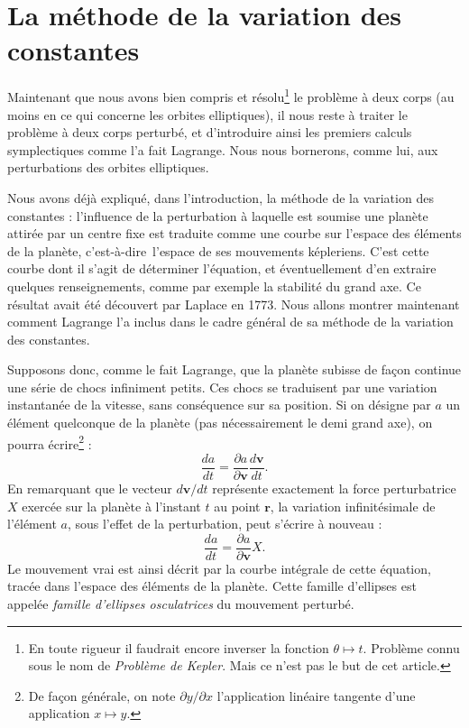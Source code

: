\documentclass[12pt,paperletter, reqno]{amsart}
\newcommand{\rr}{\mathbf{r}}
\newcommand{\vv}{\mathbf{v}}
\newcommand{\cad}{c'est-\`a-dire}
\theoremstyle{plain}
\theoremstyle{remark}
\begin{document}
  
  
  \section{La méthode de la variation des constantes}
  
  Maintenant que nous avons bien compris et résolu\footnote{En toute rigueur il faudrait encore inverser la fonction $\theta \mapsto t$. Problème connu sous le nom de \emph{Problème de Kepler}. Mais ce n'est pas le but de cet article.} le problème à deux corps (au moins en ce qui concerne les orbites elliptiques),
  il nous reste à traiter le problème à deux corps perturbé,
  et d'introduire ainsi les premiers calculs symplectiques comme l'a fait Lagrange.
  Nous nous bornerons,
  comme lui,
  aux perturbations des orbites elliptiques.
  
  Nous avons déjà expliqué,
  dans l'introduction,
  la méthode de la variation des constantes :
  l'influence de la perturbation à laquelle est soumise une planète attirée par un centre fixe est traduite comme une courbe sur l'espace des éléments de la planète,
  \cad\ l'espace de ses mouvements képleriens.
  C'est cette courbe dont il s'agit de déterminer l'équation,
  et éventuellement d'en extraire quelques renseignements,
  comme par exemple la stabilité du grand axe.
  Ce résultat avait été découvert par Laplace en 1773.
  Nous allons montrer maintenant comment Lagrange l'a inclus dans le cadre général de sa méthode de la variation des constantes.
  
  Supposons donc,
  comme le fait Lagrange,
  que la planète subisse de façon continue une série de chocs infiniment petits.
  Ces chocs se traduisent par une variation instantanée de la vitesse,
  sans conséquence sur sa position.
  Si on désigne par $a$ un élément quelconque de la planète (pas nécessairement le demi grand axe),
  on pourra écrire\footnote{De façon générale, on note $\partial y /\partial x$ l'application linéaire tangente d'une application $x\mapsto y$.} :
  \begin{equation}\label{eq_da}
    \frac{da}{dt} = \frac{\partial a}{\partial \vv}\frac{d\vv}{dt}.
  \end{equation}
  En remarquant que le vecteur $d\vv/dt$ représente exactement la force perturbatrice $X$ exercée sur la planète à l'instant $t$ au point $\rr$,
  la variation infinitésimale de l'élément $a$,
  sous l'effet de la perturbation,
  peut s'écrire à nouveau :
  \begin{equation}\label{eq_B}
    \frac{da}{dt} = \frac{\partial a}{\partial \vv}X.
  \end{equation}
  Le mouvement vrai est ainsi décrit par la courbe intégrale de cette équation,
  tracée dans l'espace des éléments de la planète.
  Cette famille d'ellipses est appelée \emph{famille d'ellipses osculatrices} du mouvement perturbé.
  
\end{document}
